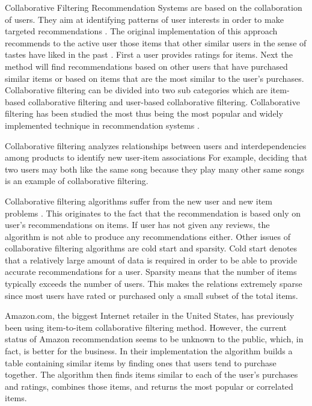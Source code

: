 \documentclass[12pt,a4paper,english
]{tutthesis}
\begin{document}
Collaborative Filtering Recommendation Systems are based on the collaboration of users. They aim at identifying patterns of user interests in order to make targeted recommendations \cite{aberger14}. The original implementation of this approach recommends to the active user those items that other similar users in the sense of tastes have liked in the past \cite{ricci11}. First a user provides ratings for items. Next the method will find recommendations based on other users that have purchased similar items or based on items that are the most similar to the user's purchases. Collaborative filtering can be divided into two sub categories which are item-based collaborative filtering and user-based collaborative filtering. Collaborative filtering has been studied the most thus being the most popular and widely implemented technique in recommendation systems \cite{gorakala15} \cite{ricci11} \cite{burke02}.

Collaborative filtering analyzes relationships between users and interdependencies among products to identify new user-item associations \cite{korenBellVolinsky09} For example, deciding that two users may both like the same song because they play many other same songs is an example of collaborative filtering. \cite{ryza15}

Collaborative filtering algorithms suffer from the new user and new item problems \cite{gorakala15}. This originates to the fact that the recommendation is based only on user's recommendations on items. If user has not given any reviews, the algorithm is not able to produce any recommendations either. Other issues of collaborative filtering algorithms are cold start and sparsity. Cold start denotes that a relatively large amount of data is required in order to be able to provide accurate recommendations for a user. Sparsity means that the number of items typically exceeds the number of users. This makes the relations extremely sparse since most users have rated or purchased only a small subset of the total items. \cite{aberger14}

Amazon.com, the biggest Internet retailer in the United States, has previously been using item-to-item collaborative filtering method. However, the current status of Amazon recommendation seems to be unknown to the public, which, in fact, is better for the business. In their implementation the algorithm builds a table containing similar items by finding ones that users tend to purchase together. The algorithm then finds items similar to each of the user's purchases and ratings, combines those items, and returns the most popular or correlated items. \cite{linden03}
\end{document}
